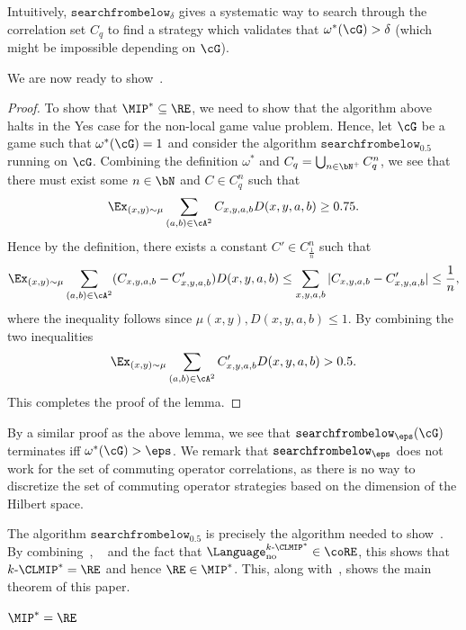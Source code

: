 Intuitively, $\texttt{searchfrombelow}_{\delta}$ gives a systematic way to search through the correlation set $C_q$ to find a strategy which validates that $\omega^*(\cG) > \delta$ (which might be impossible depending on $\cG$).

We are now ready to show~.
\begin{proof}
	To show that $\MIP^*\subseteq \RE$, we need to show that the algorithm above halts in the Yes case for the non-local game value problem. Hence, let $\cG$ be a game such that $\omega^*(\cG) = 1$ and consider the algorithm $\texttt{searchfrombelow}_{0.5}$ running on $\cG$. Combining the definition $\omega^*$ and $C_q = \bigcup_{n \in \bN^{+}} C_q^n$, we see that there must exist some $n \in \bN$ and $C \in C_q^n$ such that 
	\begin{equation*}
		\Ex_{(x,y) \sim \mu} \sum_{(a,b) \in \cA^2} C_{x,y,a,b} D(x,y,a,b) \geq 0.75. 
	\end{equation*}
	Hence by the definition, there exists a constant $C' \in C_{\frac{1}{n}}^n$ such that 
	\begin{equation*}
		\Ex_{(x,y) \sim \mu} \sum_{(a,b) \in \cA^2} (C_{x,y,a,b} - C'_{x,y,a,b})  D(x,y,a,b) \leq \sum_{x,y,a,b} |C_{x,y,a,b} - C'_{x,y,a,b} | \leq \frac{1}{n},
	\end{equation*}
	where the inequality follows since $\mu(x,y),D(x,y,a,b) \leq 1$. By combining the two inequalities
	\begin{equation*}
		\Ex_{(x,y) \sim \mu} \sum_{(a,b) \in \cA^2} C'_{x,y,a,b} D(x,y,a,b) > 0.5.
	\end{equation*}
	This completes the proof of the lemma. 
\end{proof}
By a similar proof as the above lemma, we see that $\texttt{searchfrombelow}_{\eps}(\cG)$ terminates iff $\omega^*(\cG) > \eps$. We remark that $\texttt{searchfrombelow}_{\eps}$ does not work for the set of commuting operator correlations, as there is no way to discretize the set of commuting operator strategies based on the dimension of the Hilbert space. 

The algorithm $\texttt{searchfrombelow}_{0.5}$ is precisely the algorithm needed to show~. By combining~, ~ and the fact that $\Language^{k\text{-}\CLMIP^*}_{\text{no}} \in \coRE$, this shows that $k\text{-}\CLMIP^* = \RE$ and hence $\RE \in \MIP^*$. This, along with~, shows the main theorem of this paper. 
\begin{corollary} \label{cor:MIPstarRE}
	$\MIP^*=\RE$
\end{corollary}

